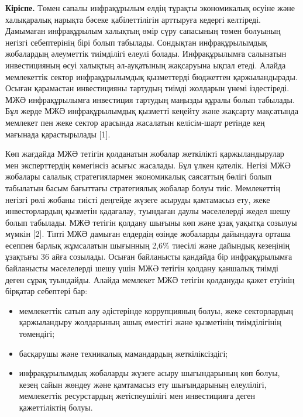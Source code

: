 \begin{multicols}{2}
{\bfseries Кіріспе.} Төмен сапалы инфрақұрылым елдің тұрақты экономикалық
өсуіне және халықаралық нарықта бәсеке қабілеттілігін арттыруға кедергі
келтіреді. Дамымаған инфрақұрылым халықтың өмір сүру сапасының төмен
болуының негізгі себептерінің бірі болып табылады. Сондықтан
инфрақұрылымдық жобалардың әлеуметтік тиімділігі елеулі болады.
Инфрақұрылымға салынатын инвестицияның өсуі халықтың әл-ауқатының
жақсаруына ықпал етеді. Алайда мемлекеттік сектор инфрақұрылымдық
қызметтерді бюджеттен қаржыландырады. Осыған қарамастан инвестицияны
тартудың тиімді жолдарын үнемі іздестіреді. МЖӘ инфрақұрылымға
инвестиция тартудың маңызды құралы болып табылады. Бұл жерде МЖӘ
инфрақұрылымдық қызметті кеңейту және жақсарту мақсатында мемлекет пен
жеке сектор арасында жасалатын келісім-шарт ретінде кең мағынада
қарастырылады {[}1{]}.~

Көп жағдайда МЖӘ тетігін қолданатын жобалар жеткілікті қаржыландырулар
мен эксперттердің көмегінсіз асығыс жасалады. Бұл үлкен қателік. Негізі
МЖӘ жобалары салалық стратегиялармен экономикалық саясаттың бөлігі болып
табылатын басым бағыттағы стратегиялық жобалар болуы тиіс. Мемлекеттің
негізгі рөлі жобаны тиісті деңгейде жүзеге асыруды қамтамасыз ету, жеке
инвесторлардың қызметін қадағалау, туындаған даулы мәселелерді жедел
шешу болып табылады. МЖӘ тетігін қолдану шығыны көп және ұзақ уақытқа
созылуы мүмкін {[}2{]}. Тіпті МЖӘ дамыған елдердің өзінде жобаларды
дайындауға орташа есеппен барлық жұмсалатын шығынның 2,6\% тиесілі және
дайындық кезеңінің ұзақтығы 36 айға созылады. Осыған байланысты қандайда
бір инфрақұрылымға байланысты мәселелерді шешу үшін МЖӘ тетігін қолдану
қаншалық тиімді деген сұрақ туындайды. Алайда мемлекет МЖӘ тетігін
қолдануды қажет етуінің бірқатар себептері бар:

\begin{itemize}
\item
  мемлекеттік сатып алу әдістерінде коррупцияның болуы, жеке
  секторлардың қаржыландыру жолдарының ашық еместігі және қызметінің
  тиімділігінің төмендігі;
\item
  басқарушы және техникалық мамандардың жеткіліксіздігі;
\item
  инфрақұрылымдық жобаларды жүзеге асыру шығындарының көп болуы, кезең
  сайын жөндеу және қамтамасыз ету шығындарының елеулілігі, мемлекеттік
  ресурстардың жетіспеушілігі мен инвестицияға деген қажеттіліктің
  болуы.
\end{itemize}


\end{multicols}
